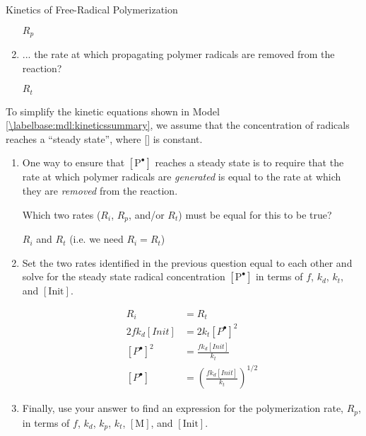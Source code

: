 \begin{activity}{Kinetics of Free-Radical Polymerization}
\begin{ctqs}
\begin{enumerate}
				\begin{solution}[0.4in]
					$R_p$
				\end{solution}
				
			\item ... the rate at which propagating polymer radicals are removed from the reaction?
			
				\begin{solution}[0.4in]
					$R_t$
				\end{solution}
				
		\end{enumerate}

	\question To simplify the kinetic equations shown in Model \ref{\labelbase:mdl:kineticssummary}, we assume that the concentration of radicals reaches a ``steady state'', where [] is constant.
	
		\begin{enumerate}
			\item One way to ensure that $[\text{P}^{\bullet}]$ reaches a steady state is to require that the rate at which polymer radicals are \emph{generated} is equal to the rate at which they are \emph{removed} from the reaction.
			
				Which two rates ($R_i$, $R_p$, and/or $R_t$) must be equal for this to be true?
				
				\begin{solution}[0.75in]
					$R_i$ and $R_t$ (i.e. we need $R_i=R_t$)
				\end{solution}
				
			\item Set the two rates identified in the previous question equal to each other and solve for the steady state radical concentration $[\text{P}^{\bullet}]$ in terms of $f$, $k_d$, $k_t$, and $[\text{Init}]$.
			
				\begin{solution}[2in]
					\begin{align*}
						R_i &= R_t \\
						2fk_d[Init] &= 2k_t[P^\bullet]^2\\
						[P^\bullet]^2 &= \frac{fk_d[Init]}{k_t}\\
						[P^\bullet] &= \left(\frac{fk_d[Init]}{k_t}\right)^{1/2}
					\end{align*}
				\end{solution}
			
			\item Finally, use your answer to find an expression for the polymerization rate, $R_p$, in terms of $f$, $k_d$, $k_p$, $k_t$, $[\text{M}]$, and $[\text{Init}]$. \label{\labelbase:ctq:Rp}
			

\end{enumerate}
\end{ctqs}
\end{activity}
